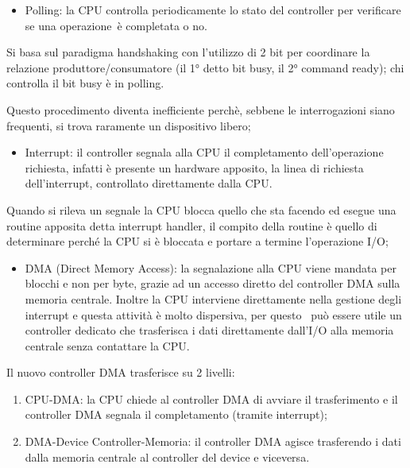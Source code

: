 \documentclass[
]{article}
\providecommand{\tightlist}{%
  \setlength{\itemsep}{0pt}\setlength{\parskip}{0pt}}
\begin{document}
{}

\begin{itemize}
\tightlist
\item
  {Polling}{: la CPU controlla periodicamente lo stato del controller
  per verificare se }{una operazione}{~è completata o no. }
\end{itemize}

{Si basa sul paradigma handshaking con l'utilizzo di 2 bit per
coordinare la relazione produttore/consumatore (il 1° detto bit busy, il
2° command ready); chi controlla il bit busy è in polling.}

{Questo procedimento diventa inefficiente perchè, sebbene le
interrogazioni siano frequenti, si trova raramente un dispositivo
libero;}

{}

\begin{itemize}
\tightlist
\item
  {Interrupt}{: il controller segnala alla CPU il completamento
  dell'operazione richiesta, infatti è presente un hardware apposito, la
  linea di richiesta dell'interrupt, controllato direttamente dalla
  CPU.}
\end{itemize}

{Quando si rileva un segnale la CPU blocca quello che sta facendo ed
esegue una routine apposita detta }{interrupt handler}{, il compito
della routine è quello di determinare perché la CPU si è bloccata e
portare a termine l'operazione I/O; ~}

{}

\begin{itemize}
\tightlist
\item
  {DMA }{(Direct Memory Access): la segnalazione alla CPU viene mandata
  per blocchi e non per byte, grazie ad un accesso diretto del
  controller DMA sulla memoria centrale. Inoltre la CPU interviene
  direttamente nella gestione degli interrupt e questa attività è molto
  dispersiva, per questo ~può essere utile un controller dedicato che
  trasferisca i dati direttamente dall'I/O alla memoria centrale senza
  contattare la CPU.}
\end{itemize}

{Il nuovo controller DMA trasferisce su 2 livelli:}

\begin{enumerate}
\tightlist
\item
  {CPU-DMA}{: la CPU chiede al controller DMA di avviare il
  trasferimento e il controller DMA segnala il completamento (tramite
  interrupt);}
\item
  {DMA-Device Controller-Memoria}{: il controller DMA agisce trasferendo
  i dati dalla memoria centrale al controller del device e viceversa.}
\end{enumerate}
\end{document}
